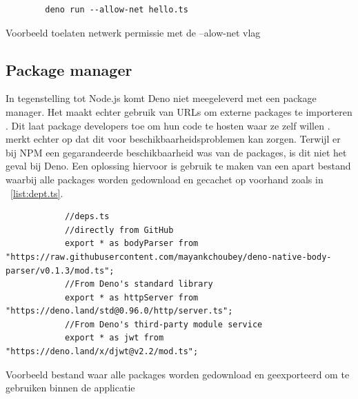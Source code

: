 \begin{listing}[H]
    \centering
    \begin{verbatim}
        deno run --allow-net hello.ts
        \end{verbatim}
        \caption{\label{fig:denocli}Voorbeeld toelaten netwerk permissie met de --alow-net vlag \autocite{DenoLand2023}}
\end{listing}

\subsection{Package manager}
In tegenstelling tot Node.js komt Deno niet meegeleverd met een package manager. 
Het maakt echter gebruik van URLs om externe packages te importeren \autocite{DenoLand2023}.
Dit laat package developers toe om hun code te hosten waar ze zelf willen \autocite{Barrow2022}.
\textcite{Choubey2021} merkt echter op dat dit voor beschikbaarheidsproblemen kan zorgen. 
Terwijl er bij NPM een gegarandeerde beschikbaarheid was van de packages, is dit niet het geval bij Deno.
Een oplossing hiervoor is gebruik te maken van een apart bestand waarbij alle packages worden gedownload en gecachet op voorhand zoals in ~\ref{list:dept.ts}.
\begin{listing}[H]
    \centering
    \begin{verbatim}
            //deps.ts
            //directly from GitHub
            export * as bodyParser from "https://raw.githubusercontent.com/mayankchoubey/deno-native-body-parser/v0.1.3/mod.ts";
            //From Deno's standard library
            export * as httpServer from "https://deno.land/std@0.96.0/http/server.ts";
            //From Deno's third-party module service
            export * as jwt from "https://deno.land/x/djwt@v2.2/mod.ts";
        \end{verbatim}
        \caption{\label{list:dept.ts}Voorbeeld bestand waar alle packages worden gedownload en geexporteerd om te gebruiken binnen de applicatie  ~\autocite{Choubey2021}} 
\end{listing}


